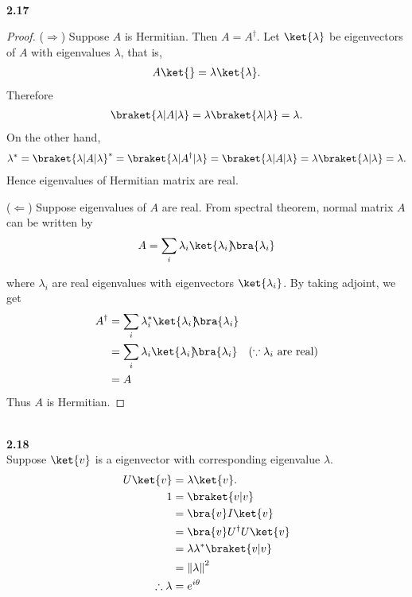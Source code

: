 \documentclass[10pt]{book}
\newcommand{\norm}[1]{\left\lVert#1\right\rVert} %
\newcommand{\kb}[1]{\ket{#1}\hspace{-1mm} \bra{#1}} %
\newcommand{\Textbf}[1]{\hspace{3mm}\\ \textbf{#1}\\}
\begin{document}
	
	\Textbf{2.17}
	\begin{proof}
		($\Rightarrow$) Suppose $A$ is Hermitian. Then $A=A^\dagger$.
		Let $\ket{\lambda}$ be eigenvectors of $A$ with eigenvalues $\lambda$, that is,
		\begin{equation}
\begin{aligned}
			A \ket{\label{text}} = \lambda \ket{\lambda}.
		\end{aligned}
\end{equation}
		Therefore
		\begin{equation}
\begin{aligned}
			\braket{\lambda | A | \lambda} = \lambda \braket{\lambda | \lambda} = \lambda.
		\end{aligned}
\end{equation}
		On the other hand,
		\begin{equation}
\begin{aligned}
			\lambda^*  = \braket{\lambda | A | \lambda}^*
			= \braket{\lambda | A^\dagger |  \lambda}
			= \braket{\lambda | A | \lambda}
			= \lambda \braket{\lambda | \lambda} = \lambda.
		\end{aligned}
\end{equation}
		Hence eigenvalues of Hermitian matrix are real.
		
		($\Leftarrow$) Suppose eigenvalues of $A$ are real. From spectral theorem, normal matrix $A$ can be written by
		\begin{equation}
			\begin{aligned}
				A= \sum_i \lambda_i \kb{\lambda_i}
			\end{aligned}
		\end{equation}

		where $\lambda_i$ are  real eigenvalues with eigenvectors $\ket{\lambda_i}$.
		By taking adjoint, we get
		\begin{equation}
\begin{aligned}
			A^\dagger &= \sum_i \lambda_i^* \kb{\lambda_i}\\
			&= \sum_i \lambda_i \kb{\lambda_i}~~~(\because \lambda_i \text{ are real})\\
			&= A
		\end{aligned}
\end{equation}
		Thus $A$ is Hermitian.
	\end{proof}
	
	\Textbf{2.18}
	
	Suppose $\ket{v}$ is a eigenvector with corresponding eigenvalue $\lambda$.
	\begin{equation}
\begin{aligned}
		U \ket{v} &= \lambda \ket{v}.\\
		1 &= \braket{v | v}\\
		&= \bra{v} I \ket{v}\\
		&= \bra{v} U^\dagger U \ket{v}\\
		&= \lambda \lambda^* \braket{v | v}\\
		&= \norm{\lambda}^2\\
		\therefore \lambda &= e^{i \theta}
	\end{aligned}
\end{equation}
	
\end{document}
